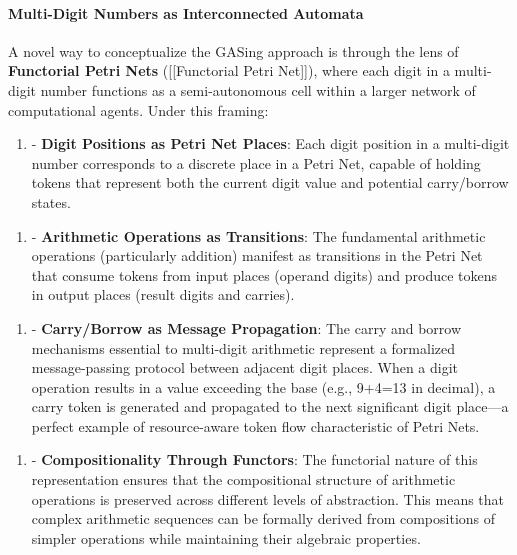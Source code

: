 \documentclass[11pt,a4paper]{article}
\begin{document}
\paragraph{Multi-Digit Numbers as Interconnected Automata}
A novel way to conceptualize the GASing approach is through the lens of \textbf{Functorial Petri Nets} ([[Functorial Petri Net]]), where each digit in a multi-digit number functions as a semi-autonomous cell within a larger network of computational agents. Under this framing:

\begin{enumerate}
  \item - \textbf{Digit Positions as Petri Net Places}: Each digit position in a multi-digit number corresponds to a discrete place in a Petri Net, capable of holding tokens that represent both the current digit value and potential carry/borrow states.
\end{enumerate}

\begin{enumerate}
  \item - \textbf{Arithmetic Operations as Transitions}: The fundamental arithmetic operations (particularly addition) manifest as transitions in the Petri Net that consume tokens from input places (operand digits) and produce tokens in output places (result digits and carries).
\end{enumerate}

\begin{enumerate}
  \item - \textbf{Carry/Borrow as Message Propagation}: The carry and borrow mechanisms essential to multi-digit arithmetic represent a formalized message-passing protocol between adjacent digit places. When a digit operation results in a value exceeding the base (e.g., 9+4=13 in decimal), a carry token is generated and propagated to the next significant digit place—a perfect example of resource-aware token flow characteristic of Petri Nets.
\end{enumerate}

\begin{enumerate}
  \item - \textbf{Compositionality Through Functors}: The functorial nature of this representation ensures that the compositional structure of arithmetic operations is preserved across different levels of abstraction. This means that complex arithmetic sequences can be formally derived from compositions of simpler operations while maintaining their algebraic properties.
\end{enumerate}
\end{document}
